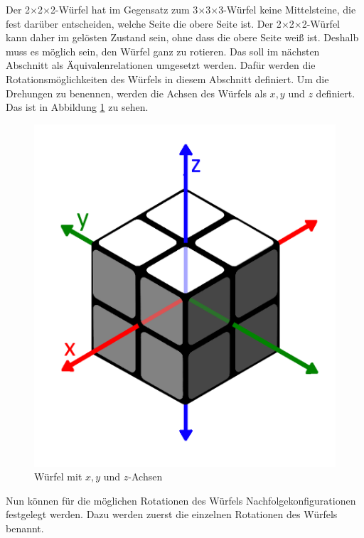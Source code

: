 \documentclass[12pt,a4paper, usenames, dvipsnames]{article}
\theoremstyle{mystyle}
\theoremstyle{definition}
\newcommand{\Ttwo}{2$\times$2$\times$2-}
\newcommand{\Tthree}{3$\times$3$\times$3-}
\begin{document}
Der \Ttwo Würfel hat im Gegensatz zum \Tthree Würfel keine Mittelsteine, die fest darüber entscheiden, welche Seite die obere Seite ist. 
Der \Ttwo Würfel kann daher im gelösten Zustand sein, ohne dass die obere Seite weiß ist. Deshalb muss es möglich sein, den Würfel ganz zu rotieren.
Das soll im nächsten Abschnitt als Äquivalenrelationen umgesetzt werden. Dafür werden die Rotationsmöglichkeiten des Würfels in diesem Abschnitt definiert.
Um die Drehungen zu benennen, werden die Achsen des Würfels als $x, y$ und $z$ definiert. Das ist in Abbildung \ref{Abbildung_Rotationsachsen} zu sehen.
\begin{figure}[h]
\centering
\includegraphics[scale=0.13]{Pfeile.png}
\caption[Würfel mit $x, y$ und $z$-Achsen]{Würfel mit $x, y$ und $z$-Achsen}
\label{Abbildung_Rotationsachsen}
\end{figure} 

Nun können für die möglichen Rotationen des Würfels Nachfolgekonfigurationen festgelegt werden. 
Dazu werden zuerst die einzelnen Rotationen des Würfels benannt. 
\end{document}
